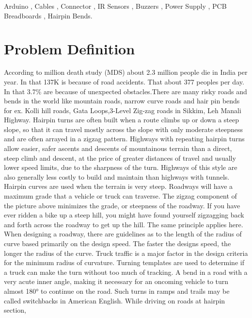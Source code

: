 \documentclass[conference]{IEEEtran}
\begin{document}
    \begin{IEEEkeywords}
        Arduino , Cables , Connector , IR Sensors , Buzzers , Power Supply , PCB Breadboards , Hairpin Bends.
    \end{IEEEkeywords}

    \section{Problem Definition}
    According to million death study (MDS) about 2.3 million people die in India per year. In that 137K is because of road accidents.
    That about 377 peoples per day. In that 3.7\% are because of unexpected obstacles.There are many risky roads and bends in the world
    like mountain roads, narrow curve roads and hair pin bends for ex. Kolli hill roads, Gata Loops,3-Level Zig-zag roads in Sikkim,
    Leh Manali Highway.
    \newline
         Hairpin turns are often built when a route climbs up or down a steep slope, so that it can travel mostly
    across the slope with only moderate steepness and are often arrayed in a zigzag pattern. Highways with
    repeating hairpin turns allow easier, safer ascents and descents of mountainous terrain than a direct, steep
    climb and descent, at the price of greater distances of travel and usually lower speed limits, due to the
    sharpness of the turn. Highways of this style are also generally less costly to build and maintain than
    highways with tunnels. Hairpin curves are used when the terrain is very steep. Roadways will have a
    maximum grade that a vehicle or truck can traverse. The zigzag component of the picture above minimizes
    the grade, or steepness of the roadway. If you have ever ridden a bike up a steep hill, you might have found
    yourself zigzagging back and forth across the roadway to get up the hill. The same principle applies here.
    When designing a roadway, there are guidelines as to the length of the radius of curve based primarily on
    the design speed. The faster the designs speed, the longer the radius of the curve. Truck traffic is a major
    factor in the design criteria for the minimum radius of curvature. Turning templates are used to determine if
    a truck can make the turn without too much of tracking. A bend in a road with a very acute inner angle,
    making it necessary for an oncoming vehicle to turn almost 180° to continue on the road. Such turns in
    ramps and trails may be called switchbacks in American English. While driving on roads at hairpin section,
\end{document}
